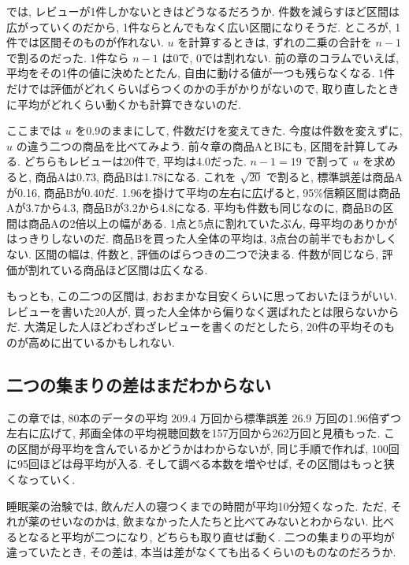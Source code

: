     では, レビューが1件しかないときはどうなるだろうか.
    件数を減らすほど区間は広がっていくのだから, 1件ならとんでもなく広い区間になりそうだ.
    ところが, 1件では区間そのものが作れない.
    $u$ を計算するときは, ずれの二乗の合計を $n-1$ で割るのだった.
    1件なら $n-1$ は0で, 0では割れない.
    前の章のコラムでいえば, 平均をその1件の値に決めたとたん, 自由に動ける値が一つも残らなくなる.
    1件だけでは評価がどれくらいばらつくのかの手がかりがないので, 取り直したときに平均がどれくらい動くかも計算できないのだ.

    ここまでは $u$ を0.9のままにして, 件数だけを変えてきた.
    今度は件数を変えずに, $u$ の違う二つの商品を比べてみよう.
    前々章の商品AとBにも, 区間を計算してみる.
    どちらもレビューは20件で, 平均は4.0だった.
    $n-1 = 19$ で割って $u$ を求めると, 商品Aは0.73, 商品Bは1.78になる.
    これを $\sqrt{20}$ で割ると, 標準誤差は商品Aが0.16, 商品Bが0.40だ.
    1.96を掛けて平均の左右に広げると, 95\%信頼区間は商品Aが3.7から4.3, 商品Bが3.2から4.8になる.
    平均も件数も同じなのに, 商品Bの区間は商品Aの2倍以上の幅がある.
    1点と5点に割れていたぶん, 母平均のありかがはっきりしないのだ.
    商品Bを買った人全体の平均は, 3点台の前半でもおかしくない.
    区間の幅は, 件数と, 評価のばらつきの二つで決まる.
    件数が同じなら, 評価が割れている商品ほど区間は広くなる.

    もっとも, この二つの区間は, おおまかな目安くらいに思っておいたほうがいい.
    レビューを書いた20人が, 買った人全体から偏りなく選ばれたとは限らないからだ.
    大満足した人ほどわざわざレビューを書くのだとしたら, 20件の平均そのものが高めに出ているかもしれない.

  \subsection{二つの集まりの差はまだわからない}

    この章では, 80本のデータの平均 $209.4$ 万回から標準誤差 $26.9$ 万回の1.96倍ずつ左右に広げて, 邦画全体の平均視聴回数を157万回から262万回と見積もった.
    この区間が母平均を含んでいるかどうかはわからないが, 同じ手順で作れば, 100回に95回ほどは母平均が入る.
    そして調べる本数を増やせば, その区間はもっと狭くなっていく.

    睡眠薬の治験では, 飲んだ人の寝つくまでの時間が平均10分短くなった.
    ただ, それが薬のせいなのかは, 飲まなかった人たちと比べてみないとわからない.
    比べるとなると平均が二つになり, どちらも取り直せば動く.
    二つの集まりの平均が違っていたとき, その差は, 本当は差がなくても出るくらいのものなのだろうか.

